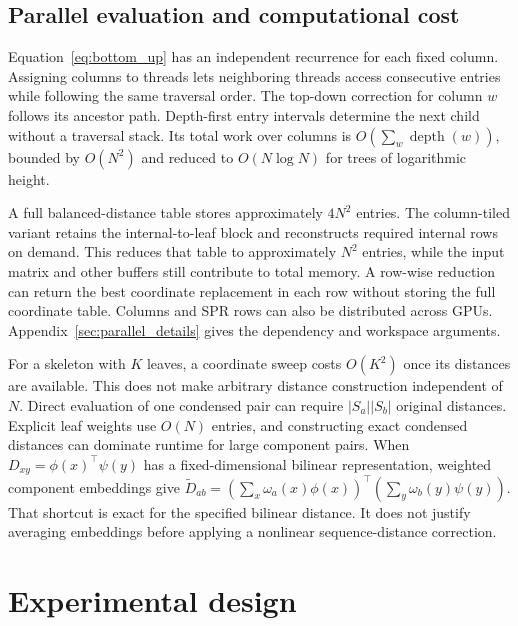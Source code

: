 \documentclass[11pt,a4paper]{article}
\makeatletter
\DeclareRobustCommand{\_}{\ifmmode\nfss@text{\textunderscore}\else\textunderscore\allowbreak\fi}
\theoremstyle{definition}
\makeatother
\begin{document}
\subsection{Parallel evaluation and computational cost}
\label{sec:parallel}

Equation~\eqref{eq:bottom_up} has an independent recurrence for each fixed column.
Assigning columns to threads lets neighboring threads access consecutive entries while following the same traversal order.
The top-down correction for column $w$ follows its ancestor path.
Depth-first entry intervals determine the next child without a traversal stack.
Its total work over columns is $O(\sum_w\operatorname{depth}(w))$, bounded by $O(N^2)$ and reduced to $O(N\log N)$ for trees of logarithmic height.

A full balanced-distance table stores approximately $4N^2$ entries.
The column-tiled variant retains the internal-to-leaf block and reconstructs required internal rows on demand.
This reduces that table to approximately $N^2$ entries, while the input matrix and other buffers still contribute to total memory.
A row-wise reduction can return the best coordinate replacement in each row without storing the full coordinate table.
Columns and SPR rows can also be distributed across GPUs.
Appendix~\ref{sec:parallel_details} gives the dependency and workspace arguments.

For a skeleton with $K$ leaves, a coordinate sweep costs $O(K^2)$ once its distances are available.
This does not make arbitrary distance construction independent of $N$.
Direct evaluation of one condensed pair can require $|S_a||S_b|$ original distances.
Explicit leaf weights use $O(N)$ entries, and constructing exact condensed distances can dominate runtime for large component pairs.
When $D_{xy}=\phi(x)^\top\psi(y)$ has a fixed-dimensional bilinear representation, weighted component embeddings give
$\widetilde D_{ab}=(\sum_x\omega_a(x)\phi(x))^\top
(\sum_y\omega_b(y)\psi(y))$.
That shortcut is exact for the specified bilinear distance.
It does not justify averaging embeddings before applying a nonlinear sequence-distance correction.

\section{Experimental design}
\label{sec:experiments}
\end{document}
